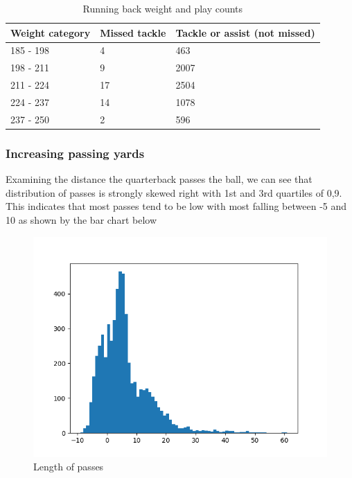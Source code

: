 \documentclass[bibtex, sigconf, hyperref={colorlinks=true,linkcolor=blue,urlcolor=blue}]{acmart}
\begin{document}
\begin{table}[H]
  \caption{Running back weight and play counts}
  \label{tab:freq}
  \begin{tabular}{lll}
    \toprule
    Weight category & Missed tackle & Tackle or assist (not missed) \\
    \midrule
    185 - 198 & 4 & 463 \\
    198 - 211 & 9 & 2007 \\
    211 - 224 & 17 & 2504 \\
    224 - 237 & 14 & 1078 \\
    237 - 250 & 2 & 596 \\
  \end{tabular}
\end{table}

\subsubsection{Increasing passing yards}

Examining the distance the quarterback passes the ball, we can see that
distribution of passes is strongly skewed right with 1st and 3rd quartiles of 0,9.
This indicates that most passes tend to be low with most falling between -5 and
10 as shown by the bar chart below
\begin{figure}[h]
  \centering
  \includegraphics[width=\linewidth]{passlength}
  \caption{Length of passes}
\end{figure}
\end{document}
